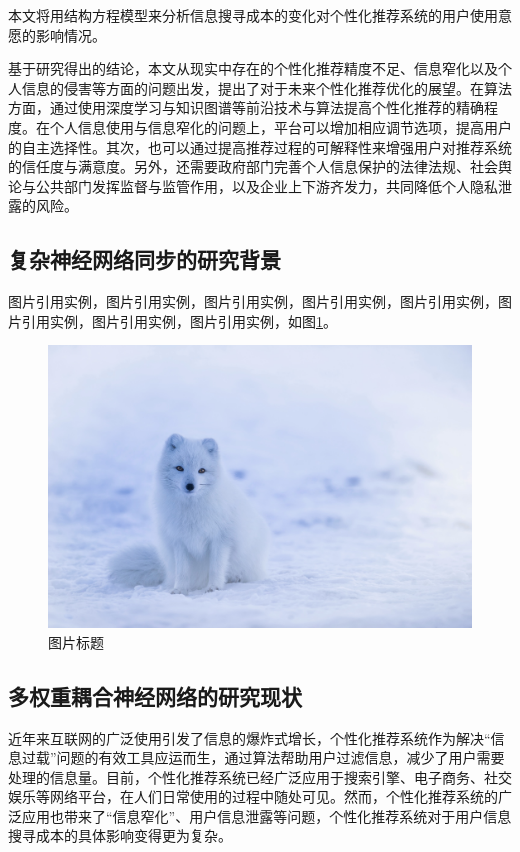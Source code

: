 \documentclass[a4paper,zihao=-4,UTF8]{ctexart}
\numberwithin{equation}{section}
\begin{document}
	本文将用结构方程模型来分析信息搜寻成本的变化对个性化推荐系统的用户使用意愿的影响情况。
	
	基于研究得出的结论，本文从现实中存在的个性化推荐精度不足、信息窄化以及个人信息的侵害等方面的问题出发，提出了对于未来个性化推荐优化的展望。在算法方面，通过使用深度学习与知识图谱等前沿技术与算法提高个性化推荐的精确程度。在个人信息使用与信息窄化的问题上，平台可以增加相应调节选项，提高用户的自主选择性。其次，也可以通过提高推荐过程的可解释性来增强用户对推荐系统的信任度与满意度。另外，还需要政府部门完善个人信息保护的法律法规、社会舆论与公共部门发挥监督与监管作用，以及企业上下游齐发力，共同降低个人隐私泄露的风险。
	\subsection{复杂神经网络同步的研究背景}
	图片引用实例，图片引用实例，图片引用实例，图片引用实例，图片引用实例，图片引用实例，图片引用实例，图片引用实例，如图\ref{fig:1-1}。
	\begin{figure}[h]
		\centering
		\includegraphics[scale = .5]{./image/test.jpg}
		\caption{图片标题}
		\label{fig:1-1}
	\end{figure}
	\subsection{多权重耦合神经网络的研究现状}
	近年来互联网的广泛使用引发了信息的爆炸式增长，个性化推荐系统作为解决“信息过载”问题的有效工具应运而生，通过算法帮助用户过滤信息，减少了用户需要处理的信息量。目前，个性化推荐系统已经广泛应用于搜索引擎、电子商务、社交娱乐等网络平台，在人们日常使用的过程中随处可见。然而，个性化推荐系统的广泛应用也带来了“信息窄化”、用户信息泄露等问题，个性化推荐系统对于用户信息搜寻成本的具体影响变得更为复杂。
	
\end{document}
